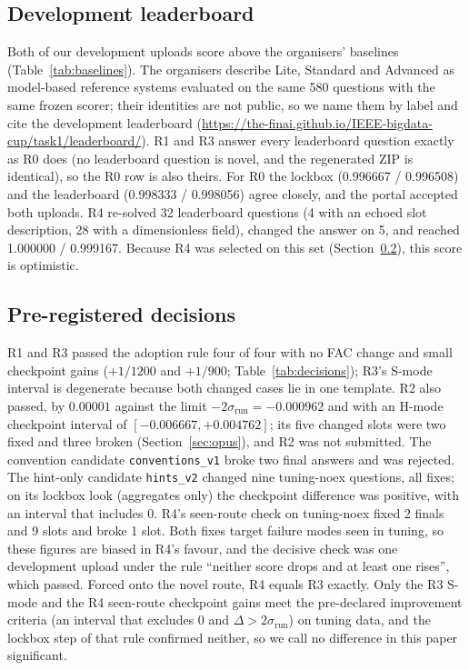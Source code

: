 \documentclass[conference]{IEEEtran}
\newcommand{\id}[1]{\texttt{#1}}
\begin{document}
\subsection{Development leaderboard}
Both of our development uploads score above the organisers' baselines (Table~\ref{tab:baselines}). The organisers describe Lite, Standard and Advanced as model-based reference systems evaluated on the same 580 questions with the same frozen scorer; their identities are not public, so we name them by label and cite the development leaderboard (\url{https://the-finai.github.io/IEEE-bigdata-cup/task1/leaderboard/}). R1 and R3 answer every leaderboard question exactly as R0 does (no leaderboard question is novel, and the regenerated ZIP is identical), so the R0 row is also theirs. For R0 the lockbox (0.996667 / 0.996508) and the leaderboard (0.998333 / 0.998056) agree closely, and the portal accepted both uploads. R4 re-solved 32 leaderboard questions (4 with an echoed slot description, 28 with a dimensionless field), changed the answer on 5, and reached 1.000000 / 0.999167. Because R4 was selected on this set (Section~\ref{sec:decisions}), this score is optimistic.

\subsection{Pre-registered decisions}\label{sec:decisions}
R1 and R3 passed the adoption rule four of four with no FAC change and small checkpoint gains ($+1/1200$ and $+1/900$; Table~\ref{tab:decisions}); R3's S-mode interval is degenerate because both changed cases lie in one template. R2 also passed, by $0.00001$ against the limit $-2\sigma_{\mathrm{run}}=-0.000962$ and with an H-mode checkpoint interval of $[-0.006667,+0.004762]$; its five changed slots were two fixed and three broken (Section~\ref{sec:opus}), and R2 was not submitted. The convention candidate \id{conventions\_v1} broke two final answers and was rejected. The hint-only candidate \id{hints\_v2} changed nine tuning-noex questions, all fixes; on its lockbox look (aggregates only) the checkpoint difference was positive, with an interval that includes 0. R4's seen-route check on tuning-noex fixed 2 finals and 9 slots and broke 1 slot. Both fixes target failure modes seen in tuning, so these figures are biased in R4's favour, and the decisive check was one development upload under the rule ``neither score drops and at least one rises'', which passed. Forced onto the novel route, R4 equals R3 exactly. Only the R3 S-mode and the R4 seen-route checkpoint gains meet the pre-declared improvement criteria (an interval that excludes 0 and $\Delta>2\sigma_{\mathrm{run}}$) on tuning data, and the lockbox step of that rule confirmed neither, so we call no difference in this paper significant.
\end{document}
